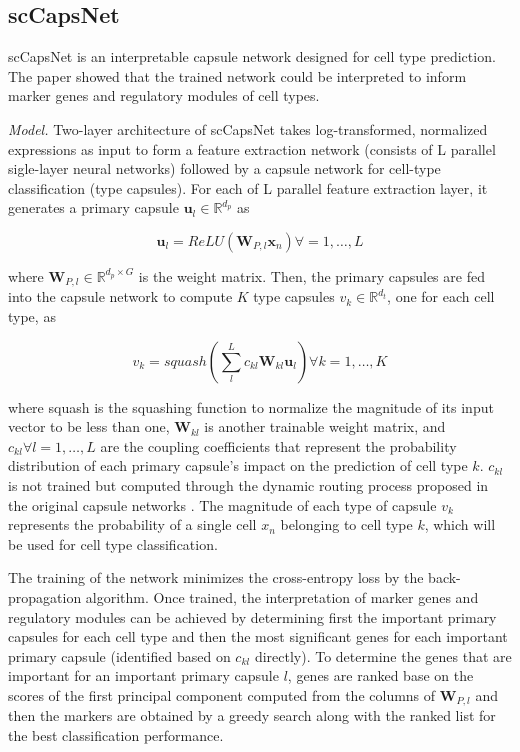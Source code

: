 \documentclass[
]{book}
\begin{document}
\hypertarget{ch-5-6-2}{%
\subsection{scCapsNet}\label{ch-5-6-2}}

scCapsNet \citep{RN157} is an interpretable capsule network designed for cell type prediction. The paper showed that the trained network could be interpreted to inform marker genes and regulatory modules of cell types.

\emph{Model.} Two-layer architecture of scCapsNet takes log-transformed, normalized expressions as input to form a feature extraction network (consists of L parallel sigle-layer neural networks) followed by a capsule network for cell-type classification (type capsules). For each of L parallel feature extraction layer, it generates a primary capsule \(\boldsymbol{u}_{l} \in \mathbb{R}^{d_{p}}\) as

\begin{equation}
\boldsymbol{u}_{l} = ReLU(\boldsymbol{W}_{P,l} \boldsymbol{x}_{n}) \forall = 1 , … , L  \label{eq:eq43}
\end{equation}

where \(\boldsymbol{W}_{P,l} \in \mathbb{R}^{d_{p}×G}\) is the weight matrix. Then, the primary capsules are fed into the capsule network to compute \(K\) type capsules \(v_{k} \in \mathbb{R}^{d_{t}}\), one for each cell type, as

\begin{equation}
v_{k}=squash(\sum_{l}^{L}c_{kl}\boldsymbol{W}_{kl}\boldsymbol{u}_{l}) \forall k=1,…,K   \label{eq:eq44}
\end{equation}

where squash is the squashing function \citep{RN159} to normalize the magnitude of its input vector to be less than one, \(\boldsymbol{W}_{kl}\) is another trainable weight matrix, and \(c_{kl} \forall l=1,…,L\) are the coupling coefficients that represent the probability distribution of each primary capsule's impact on the prediction of cell type \(k\). \(c_{kl}\) is not trained but computed through the dynamic routing process proposed in the original capsule networks \citep[@][]{RN157}. The magnitude of each type of capsule \(v_{k}\) represents the probability of a single cell \(x_{n}\) belonging to cell type \(k\), which will be used for cell type classification.

The training of the network minimizes the cross-entropy loss by the back-propagation algorithm. Once trained, the interpretation of marker genes and regulatory modules can be achieved by determining first the important primary capsules for each cell type and then the most significant genes for each important primary capsule (identified based on \(c_{kl}\) directly). To determine the genes that are important for an important primary capsule \(l\), genes are ranked base on the scores of the first principal component computed from the columns of \(\boldsymbol{W}_{P,l}\) and then the markers are obtained by a greedy search along with the ranked list for the best classification performance.
\end{document}
